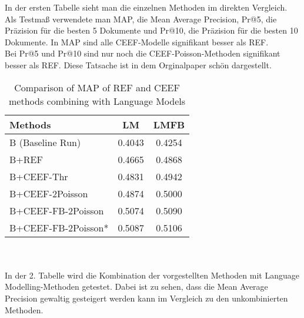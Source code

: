 In der ersten Tabelle sieht man die einzelnen Methoden im direkten Vergleich. Als Testmaß verwendete man MAP, die Mean Average Precision, Pr@5, die Präzision für die besten 5 Dokumente und Pr@10, die Präzision für die besten 10 Dokumente. In MAP sind alle CEEF-Modelle signifikant besser als REF.\\
Bei Pr@5 und Pr@10 sind nur noch die CEEF-Poisson-Methoden signifikant besser als REF. Diese Tatsache ist in dem Orginalpaper \NaNg\cite{paper:Na} schön dargestellt.\\
\begin{table}[h]
	\centering
	\begin{tabular}{lS[tabnumalign=centre,tabformat=1.4,decimalsymbol=comma]S[tabnumalign=centre,tabformat=1.4,decimalsymbol=comma]}
		\toprule
		Methods & {LM} & {LMFB} \\
		\midrule
		B (Baseline Run) & 0.4043 & 0.4254 \\
		B+REF & 0.4665 & 0.4868 \\
		B+CEEF-Thr & 0.4831 & 0.4942 \\
		B+CEEF-2Poisson & 0.4874 & 0.5000 \\
		B+CEEF-FB-2Poisson & 0.5074 & 0.5090 \\
		B+CEEF-FB-2Poisson* & 0.5087 & 0.5106 \\
		\bottomrule
	\end{tabular}
	\caption{Comparison of MAP of REF and CEEF methods combining with Language Models}
	\cite{paper:Na}
\end{table}\\
\\
In der 2. Tabelle wird die Kombination der vorgestellten Methoden mit Language Modelling-Methoden getestet. Dabei ist zu sehen, dass die Mean Average Precision gewaltig gesteigert werden kann im Vergleich zu den unkombinierten Methoden.
